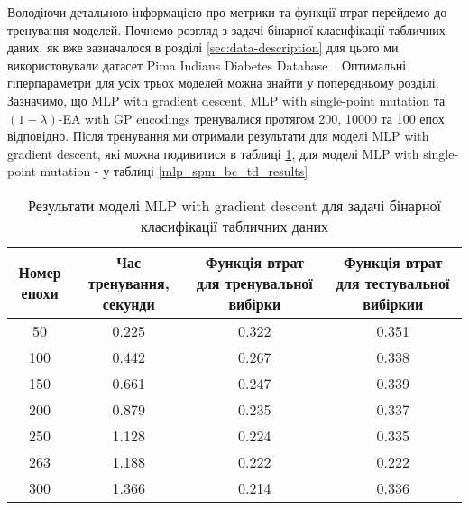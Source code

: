 Володіючи детальною інформацією про метрики та функції втрат перейдемо до тренування моделей. Почнемо розгляд з задачі бінарної класифікації табличних даних, як вже зазначалося в розділі \ref{sec:data-description} для цього ми використовували датасет Pima Indians Diabetes Database~\cite{ct30}. Оптимальні гіперпараметри для усіх трьох моделей можна знайти у попередньому розділі. Зазначимо, що MLP with gradient descent, MLP with single-point mutation та $(1+\lambda)$-EA with GP encodings тренувалися протягом 200, 10000 та 100 епох відповідно. Після тренування ми отримали результати для моделі MLP with gradient descent, які можна подивитися в таблиці \ref{mlp_gd_bc_td_results}, для моделі MLP with single-point mutation - у таблиці \ref{mlp_spm_bc_td_results}

\begin{table}[ht]
	\caption{Результати моделі MLP with gradient descent для задачі бінарної класифікації табличних даних}
	\label{mlp_gd_bc_td_results}
	\centering
	\begin{adjustbox}{max width=\textwidth}
		\begin{tabular}{|c|c|c|c|}
			\hline 
			Номер епохи & Час тренування, секунди & Функція втрат для тренувальної вибірки & Функція втрат для тестувальної вибіркии \\
			\hline 
			50 & 0.225 & 0.322 & 0.351 \\
			\hline 
			100 & 0.442 & 0.267 & 0.338 \\
			\hline
			150 & 0.661 & 0.247 & 0.339 \\
			\hline
			200 & 0.879 & 0.235 & 0.337 \\
			\hline
			250 & 1.128 & 0.224 & 0.335 \\
			\hline
			263 & 1.188 & 0.222 & 0.222 \\
			\hline
			300 & 1.366 & 0.214 & 0.336 \\
			\hline
		\end{tabular}
	\end{adjustbox}
\end{table}

